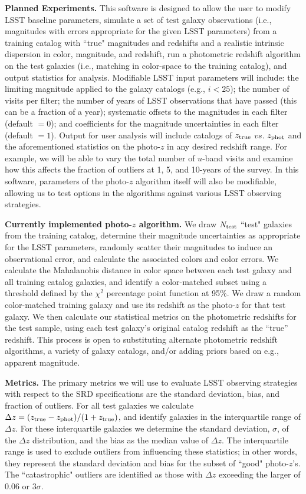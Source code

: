 \textbf{Planned Experiments.} This software is designed to allow the user to modify LSST baseline parameters, simulate a set of test galaxy observations (i.e., magnitudes with errors appropriate for the given LSST parameters) from a training catalog with ``true" magnitudes and redshifts and a realistic intrinsic dispersion in color, magnitude, and redshift, run a photometric redshift algorithm on the test galaxies (i.e., matching in color-space to the training catalog), and output statistics for analysis. Modifiable LSST input parameters will include: the limiting magnitude applied to the galaxy catalogs (e.g., $i<25$); the number of visits per filter; the number of years of LSST observations that have passed (this can be a fraction of a year); systematic offsets to the magnitudes in each filter (default $=0$); and coefficients for the magnitude uncertainties in each filter (default $=1$).  Output for user analysis will include catalogs of $z_{\rm true}$ $vs.$ $z_{\rm phot}$ and the aforementioned statistics on the photo-$z$ in any desired redshift range. For example, we will be able to vary the total number of $u$-band visits and examine how this affects the fraction of outliers at 1, 5, and 10-years of the survey. In this software, parameters of the photo-$z$ algorithm itself will also be modifiable, allowing us to test options in the algorithms against various LSST observing strategies.

\textbf{Currently implemented photo-$z$ algorithm.} We draw $N_{\rm test}$ ``test" galaxies from the training catalog, determine their magnitude uncertainties as appropriate for the LSST parameters, randomly scatter their magnitudes to induce an observational error, and calculate the associated colors and color errors. We calculate the Mahalanobis distance in color space between each test galaxy and all training catalog galaxies, and identify a color-matched subset using a threshold defined by the $\chi^2$ percentage point function at 95\%. We draw a random color-matched training galaxy and use its redshift as the photo-$z$ for that test galaxy. We then calculate our statistical metrics on the photometric redshifts for the test sample, using each test galaxy's original catalog redshift as the ``true'' redshift. This process is open to substituting alternate photometric redshift algorithms, a variety of galaxy catalogs, and/or adding priors based on e.g., apparent magnitude.

\textbf{Metrics.} The primary metrics we will use to evaluate LSST observing strategies with respect to the SRD specifications are the standard deviation, bias, and fraction of outliers. For all test galaxies we calculate $\Delta z = (z_{\rm true} - z_{\rm phot}) / (1+z_{\rm true})$, and identify galaxies in the interquartile range of $\Delta z$. For these interquartile galaxies we determine the standard deviation, $\sigma$, of the $\Delta z$ distribution, and the bias as the median value of $\Delta z$. The interquartile range is used to exclude outliers from influencing these statistics; in other words, they represent the standard deviation and bias for the subset of ``good" photo-$z$'s. The ``catastrophic" outliers are identified as those with $\Delta z$ exceeding the larger of 0.06 or 3$\sigma$. 

